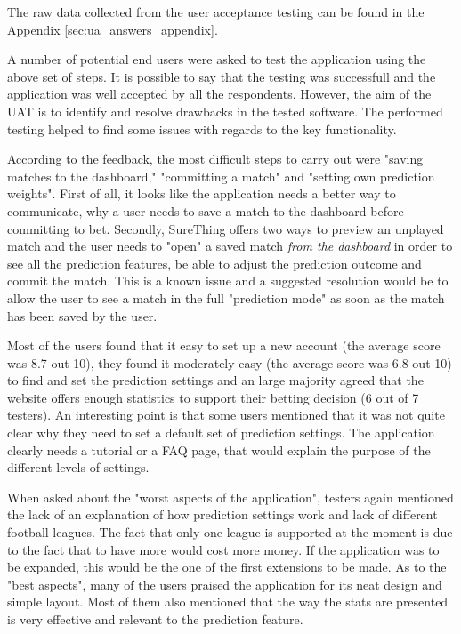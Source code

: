 The raw data collected from the user acceptance testing can be found in the Appendix \ref{sec:ua_answers_appendix}.

A number of potential end users were asked to test the application using the above set of steps. It is possible to say that the testing was successfull and the application was well accepted by all the respondents. However, the aim of the UAT is to identify and resolve drawbacks in the tested software. The performed testing helped to find some issues with regards to the key functionality.

According to the feedback, the most difficult steps to carry out were "saving matches to the dashboard," "committing a match" and "setting own prediction weights". First of all, it looks like the application needs a better way to communicate, why a user needs to save a match to the dashboard before committing to bet. Secondly, SureThing offers two ways to preview an unplayed match and the user needs to "open" a saved match \emph{from the dashboard} in order to see all the prediction features, be able to adjust the prediction outcome and commit the match. This is a known issue and a suggested resolution would be to allow the user to see a match in the full "prediction mode" as soon as the match has been saved by the user.

Most of the users found that it easy to set up a new account (the average score was 8.7 out 10), they found it moderately easy (the average score was 6.8 out 10) to find and set the prediction settings and an large majority agreed that the website offers enough statistics to support their betting decision (6 out of 7 testers). An interesting point is that some users mentioned that it was not quite clear why they need to set a default set of prediction settings. The application clearly needs a tutorial or a FAQ page, that would explain the purpose of the different levels of settings.

When asked about the "worst aspects of the application", testers again mentioned the lack of an explanation of how prediction settings work and lack of different football leagues. The fact that only one league is supported at the moment is due to the fact that to have more would cost more money. If the application was to be expanded, this would be the one of the first extensions to be made. As to the "best aspects", many of the users praised the application for its neat design and simple layout. Most of them also mentioned that the way the stats are presented is very effective and relevant to the prediction feature.

